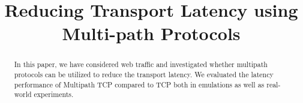 \documentclass[conference,a4paper]{IEEEtran}
\theoremstyle{definition}
\newcommand{\per}[1]{\textcolor{orange}{{\sf PH: #1}}}
\begin{document}
\title{Reducing Transport Latency using Multi-path Protocols}

\author{
}

\maketitle


\begin{abstract}
In this paper, we have considered web traffic and investigated whether multipath
protocols can be utilized to reduce the transport latency. We evaluated the
latency performance of Multipath TCP compared to TCP both in emulations as well
as real-world experiments.
\end{abstract}














\end{document}
